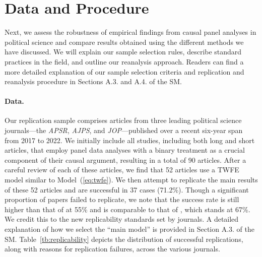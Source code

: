 \documentclass[12pt]{article}
\begin{document}


\FloatBarrier


                                       
\section{Data and Procedure}\label{sc:data}

Next, we assess the robustness of empirical findings from causal panel analyses in
political science and compare results obtained using the different methods we have discussed. We will explain our sample selection rules, describe standard practices in the field, and outline our reanalysis approach. Readers can find a more detailed explanation of our sample selection criteria and replication and reanalysis procedure in Sections A.3. and A.4. of the SM.

\paragraph*{Data.} Our replication sample comprises articles from three leading
political science journals---the {\it APSR}, {\it AJPS}, and {\it JOP}---published over a recent six-year span from 2017 to 2022. We initially include all studies, including both long and short articles, that employ panel data analyses with a binary treatment as a crucial component of their causal argument, resulting in a total of 90 articles. After a careful review of each of these articles, we find that 52 articles use a TWFE model similar to Model~(\ref{eq:twfe}). We then attempt to replicate the main results of these 52 articles and are successful in 37 cases (71.2\%). Though a significant proportion of papers failed to replicate, we note that the success rate is still higher than that of \citet{hainmueller2019much} at 55\% and is comparable to that of \citet{lal2021much}, which stands at 67\%. We credit this to the new replicability standards set by journals. A detailed explanation of how we select the ``main model'' is provided in Section A.3. of the SM. Table~\ref{tb:replicability} depicts the distribution of successful replications, along with reasons for replication failures, across the various journals.
\end{document}
